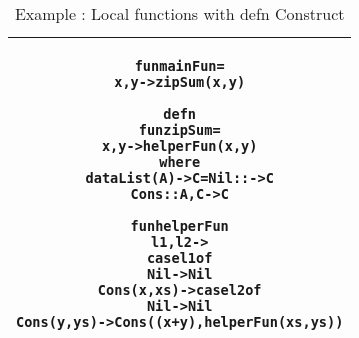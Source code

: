 \documentclass[11pt]{article}
\begin{document}
\begin{table}[!h]
\begin{center}
\begin{tabular}{|c|} \hline
\begin{minipage}{5in}
\begin{alltt}


  fun mainFun = 
      x,y -> zipSum(x,y)
  
  defn
    fun zipSum =
      x,y -> helperFun (x,y)
  where 
    data List(A) -> C = Nil  ::     -> C
                        Cons :: A,C -> C 

    fun helperFun 
      l1,l2 ->
        case l1 of 
          Nil -> Nil
          Cons(x,xs) -> case l2 of
                          Nil -> Nil
                          Cons(y,ys) -> Cons((x+y),helperFun(xs,ys))

\end{alltt} 
\end {minipage} 
\tabularnewline
\hline
\end{tabular}
\caption{Example : Local functions with {\sf defn} Construct}
\label{lam:defnExample}
\end{center}
\end{table}
\end{document}

